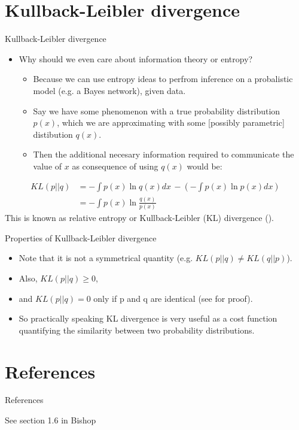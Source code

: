 \documentclass{beamer}
\begin{document}
\section{Kullback-Leibler divergence}
\begin{frame}{Kullback-Leibler divergence}
\begin{itemize}
\item Why should we even care about information theory or entropy?
  \begin{itemize}
  \item Because we can use entropy ideas to perfrom inference on a probalistic model (e.g. a Bayes network), given data.
  \item Say we have some phenomenon with a true probability distribution $p(x)$, which we are approximating with some [possibly parametric] distibution $q(x)$.
  \item Then the additional necesary information required to communicate the value of $x$ as consequence of using $q(x)$ would be:
  \end{itemize}
\end{itemize}
\begin{equation}
  \begin{split}
    KL(p||q) & = - \int p(x) \ln q(x) dx \, - \left(-\int p(x) \ln p(x) dx \right) \\
    & =  - \int p(x) \ln  \frac{q(x)}{p(x)}
  \end{split}
\end{equation}
  This is known as relative entropy or  Kullback-Leibler (KL) divergence (\cite{kullback1951}).
\end{frame}

\begin{frame}{Properties of Kullback-Leibler divergence}
  \begin{itemize}
  \item Note that it is not a symmetrical quantity (e.g. $KL(p||q) \ne KL(q||p)$).
  \item Also, $KL(p||q) \ge 0$,
  \item and $KL(p||q) = 0$ only if p and q are identical (see \cite{bishop} for proof).
  \item So practically speaking KL divergence is very useful as a cost function quantifying the similarity between two probability distributions.
  \end{itemize}
\end{frame}


\section{References}
\begin{frame}{References}
  \begin{block}{See section 1.6 in Bishop}
    \printbibliography
  \end{block}
\end{frame}

\end{document}
